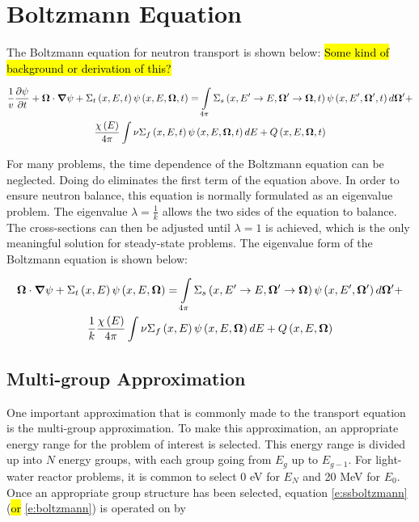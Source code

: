 \section{Boltzmann Equation}

The Boltzmann equation for neutron transport is shown below: \hl{Some kind of background or derivation of this?}

\begin{gather}\label{e:boltzmann}
\frac{1}{v} \frac{\partial \psi}{\partial t} + \bm \Omega \cdot \bm \nabla \psi + \Sigma_t\left(x,E,t\right)\psi\left(x,E,\bm \Omega,t\right) = \intop_{4\pi} \Sigma_s\left(x,E' \rightarrow E, \bm \Omega' \rightarrow \bm \Omega, t\right) \psi\left(x,E',\bm \Omega',t\right) d\bm \Omega' + \nonumber\\
\frac{\chi\left(E\right)}{4\pi} \intop \nu \Sigma_f\left(x,E,t\right) \psi\left(x,E,\bm \Omega,t\right) dE + Q\left(x,E,\bm \Omega,t\right)
\end{gather}

For many problems, the time dependence of the Boltzmann equation can be neglected.  Doing do eliminates the first term of the equation above.  In order to ensure neutron balance, this equation is normally formulated as an eigenvalue problem.  The eigenvalue $\lambda = \frac{1}{k}$ allows the two sides of the equation to balance.  The cross-sections can then be adjusted until $\lambda = 1$ is achieved, which is the only meaningful solution for steady-state problems.  The eigenvalue form of the Boltzmann equation is shown below:

\begin{gather}\label{e:ssboltzmann}
\bm \Omega \cdot \bm \nabla \psi + \Sigma_t\left(x,E\right)\psi\left(x,E,\bm \Omega\right) = \intop_{4\pi} \Sigma_s\left(x,E' \rightarrow E, \bm \Omega' \rightarrow \bm \Omega\right) \psi\left(x,E',\bm \Omega'\right) d\bm \Omega' + \nonumber\\
\frac{1}{k}\frac{\chi\left(E\right)}{4\pi} \intop \nu \Sigma_f\left(x,E\right) \psi\left(x,E,\bm \Omega\right) dE + Q\left(x,E,\bm \Omega\right)
\end{gather}

\subsection{Multi-group Approximation}

One important approximation that is commonly made to the transport equation is the multi-group approximation.  To make this approximation, an appropriate energy range for the problem of interest is selected.  This energy range is divided up into $N$ energy groups, with each group going from $E_g$ up to $E_{g-1}$.  For light-water reactor problems, it is common to select 0 eV for $E_N$ and 20 MeV for $E_0$.  Once an appropriate group structure has been selected, equation \ref{e:ssboltzmann} (\hl{or} \ref{e:boltzmann}) is operated on by 


